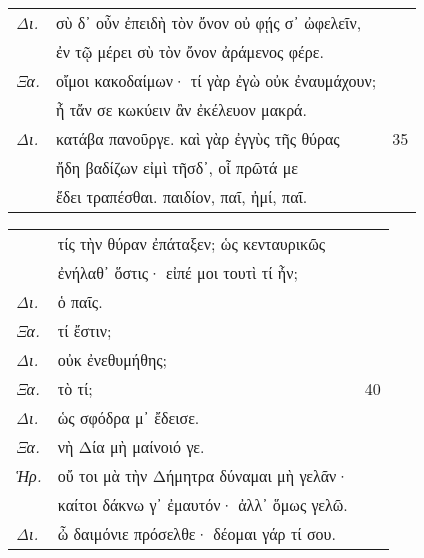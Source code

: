 \documentclass[13pt]{article}
\begin{document}
\begin{greek}
\begin{spacing}{1.5}
\begin{tabularx}{\textwidth}{@{}lXr@{}}
  \textit{Δι.} & σὺ δ᾽ οὖν ἐπειδὴ τὸν ὄνον οὐ φῄς σ᾽ ὠφελεῖν, & \\
  & ἐν τῷ μέρει σὺ τὸν ὄνον ἀράμενος φέρε. & \\
  \textit{Ξα.} & οἴμοι κακοδαίμων· τί γὰρ ἐγὼ οὐκ ἐναυμάχουν; & \\
  & ἦ τἄν σε κωκύειν ἂν ἐκέλευον μακρά. & \\
  \textit{Δι.} & κατάβα πανοῦργε. καὶ γὰρ ἐγγὺς τῆς θύρας & 35 \\
  & ἤδη βαδίζων εἰμὶ τῆσδ᾽, οἷ πρῶτά με & \\
  & ἔδει τραπέσθαι. παιδίον, παῖ, ἠμί, παῖ. & \\
\end{tabularx}

\noindent\textit{\MakeUppercase{}}

\begin{tabularx}{\textwidth}{@{}lXr@{}}
  & τίς τὴν θύραν ἐπάταξεν; ὡς κενταυρικῶς & \\
  & ἐνήλαθ᾽ ὅστις· εἰπέ μοι τουτὶ τί ἦν; & \\
  \textit{Δι.} & ὁ παῖς. & \\
  \textit{Ξα.} & \hspace*{3em}τί ἔστιν; & \\
  \textit{Δι.} & \hspace*{6.5em}οὐκ ἐνεθυμήθης; & \\
  \textit{Ξα.} & \hspace*{13.5em}τὸ τί; & 40 \\
  \textit{Δι.} & ὡς σφόδρα μ᾽ ἔδεισε. & \\
  \textit{Ξα.} & \hspace*{8.5em}νὴ Δία μὴ μαίνοιό γε. & \\
  \textit{Ἡρ.} & οὔ τοι μὰ τὴν Δήμητρα δύναμαι μὴ γελᾶν· & \\
  & καίτοι δάκνω γ᾽ ἐμαυτόν· ἀλλ᾽ ὅμως γελῶ. & \\
  \textit{Δι.} & ὦ δαιμόνιε πρόσελθε· δέομαι γάρ τί σου. & \\
\end{tabularx}

\end{spacing}

\newpage


\end{greek}
\end{document}
